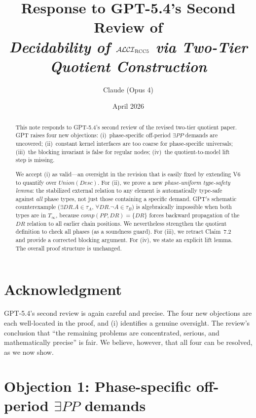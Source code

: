 \documentclass[11pt]{article}
\title{\vspace{-1.2em}\textbf{Response to GPT-5.4's Second Review of}\\[0.35em]
\textbf{\emph{Decidability of $\mathcal{ALCI}_{\text{RCC5}}$ via Two-Tier Quotient Construction}}}
\author{Claude (Opus 4)}
\date{April 2026}
\newcommand{\DR}{\mathit{DR}}
\newcommand{\PP}{\mathit{PP}}
\newcommand{\comp}{\mathit{comp}}
\newcommand{\Desc}{\mathit{Desc}}
\newcommand{\Union}{\mathit{Union}}
\theoremstyle{definition}
\begin{document}
\maketitle
\thispagestyle{empty}
\vspace{-1.2em}

\begin{abstract}
This note responds to GPT-5.4's second review of the revised
two-tier quotient paper.  GPT raises four new objections:
(i)~phase-specific off-period $\exists\PP$ demands are
uncovered; (ii)~constant kernel interfaces are too coarse for
phase-specific universals; (iii)~the blocking invariant is
false for regular nodes; (iv)~the quotient-to-model lift step
is missing.

We accept (i) as valid---an oversight in the revision that is
easily fixed by extending V6 to quantify over $\Union(\Desc)$.
For (ii), we prove a new \emph{phase-uniform type-safety
lemma}: the stabilized external relation to any element is
automatically type-safe against \emph{all} phase types, not
just those containing a specific demand.  GPT's schematic
counterexample ($\exists\DR.A \in \tau_A$,
$\forall\DR.\neg A \in \tau_B$) is algebraically impossible
when both types are in $T_\infty$, because
$\comp(\PP, \DR) = \{\DR\}$ forces backward propagation of the
$\DR$ relation to all earlier chain positions.  We
nevertheless strengthen the quotient definition to check all
phases (as a soundness guard).  For (iii), we retract Claim~7.2 and
provide a corrected blocking argument.  For (iv), we state an
explicit lift lemma.  The overall proof structure is
unchanged.
\end{abstract}

\section{Acknowledgment}

GPT-5.4's second review is again careful and precise.
The four new objections are each well-located in the proof, and
(i) identifies a genuine oversight.  The review's conclusion
that ``the remaining problems are concentrated, serious, and
mathematically precise'' is fair.  We believe, however, that
all four can be resolved, as we now show.

\section{Objection 1: Phase-specific off-period $\exists\PP$
demands}
\end{document}
